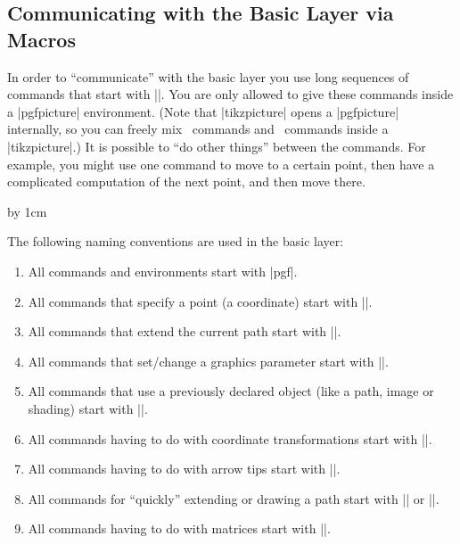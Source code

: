 \subsection{Communicating with the Basic Layer via Macros}

In order to ``communicate'' with the basic layer you use long
sequences of commands that start with |\pgf|. You are only allowed to
give these commands inside a |{pgfpicture}| environment. (Note that
|{tikzpicture}| opens a |{pgfpicture}| internally, so you can freely
mix \pgfname\ commands and \tikzname\ commands inside a
|{tikzpicture}|.) It is possible to ``do other things'' between the
commands. For example, you might use one command to move to a certain
point, then have a complicated computation of the next point, and then
move there.

\begin{codeexample}[]
\newdimen\myypos
\begin{pgfpicture}
  \pgfpathmoveto{\pgfpoint{0cm}{\myypos}}
  \pgfpathlineto{\pgfpoint{1cm}{\myypos}}
  \advance \myypos by 1cm
  \pgfpathlineto{\pgfpoint{1cm}{\myypos}}
  \pgfpathclose
\end{pgfpicture}
\end{codeexample}

The following naming conventions are used in the basic layer:

\begin{enumerate}
\item
  All commands and environments start with |pgf|.
\item
  All commands that specify a point (a coordinate) start with |\pgfpoint|.
\item
  All commands that extend the current path start with |\pgfpath|.
\item
  All commands that set/change a graphics parameter start with |\pgfset|.
\item
  All commands that use a previously declared object (like a path,
  image or shading) start with |\pgfuse|.
\item
  All commands having to do with coordinate transformations start with
  |\pgftransform|.
\item
  All commands having to do with arrow tips start with |\pgfarrows|.
\item
  All commands for ``quickly'' extending or drawing a path start with
  |\pgfpathq| or |\pgfusepathq|.
\item
  All commands having to do with matrices start with |\pgfmatrix|.
\end{enumerate}


